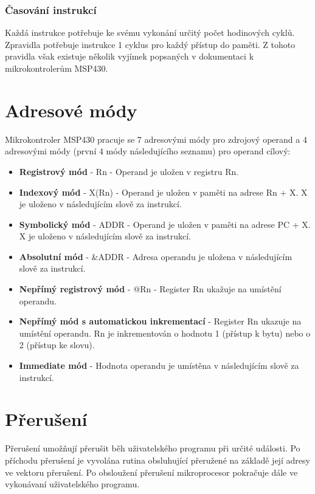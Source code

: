 \subsubsection{Časování instrukcí}

Každá instrukce potřebuje ke svému vykonání určitý počet hodinových cyklů. Zpravidla potřebuje instrukce 1 cyklus pro každý přístup do paměti. Z tohoto pravidla však existuje několik vyjímek popsaných v dokumentaci k mikrokontrolerům MSP430.
 
\section{Adresové módy}

Mikrokontroler MSP430 pracuje se 7 adresovými módy pro zdrojový operand a 4 adresovými módy (první 4 módy následujícího seznamu) pro operand cílový:

\begin{itemize}
\item \textbf{Registrový mód} - Rn - Operand je uložen v registru Rn.
\item \textbf{Indexový mód} - X(Rn) - Operand je uložen v paměti na adrese Rn + X. X je uloženo v následujícím slově za instrukcí.
\item \textbf{Symbolický mód} - ADDR - Operand je uložen v paměti na adrese PC + X. X je uloženo v následujícím slově za instrukcí.
\item \textbf{Absolutní mód} - \&ADDR - Adresa operandu je uložena v následujícím slově za instrukcí.
\item \textbf{Nepřímý registrový mód} - @Rn - Register Rn ukažuje na umístění operandu.
\item \textbf{Nepřímý mód s automatickou inkrementací} - Register Rn ukazuje na umístění operandu. Rn je inkrementován o hodnotu 1 (přístup k bytu) nebo o 2 (přístup ke slovu).
\item \textbf{Immediate mód} - Hodnota operandu je umístěna v následujícím slově za instrukcí.
\end{itemize}


\section{Přerušení}

Přerušení umožňují přerušit běh uživatelského programu při určité události. Po příchodu přerušení je vyvolána rutina obsluhující přeružené na základě její adresy ve vektoru přerušení. Po obsloužení přerušení mikroprocesor pokračuje dále ve vykonávaní uživatelského programu.


